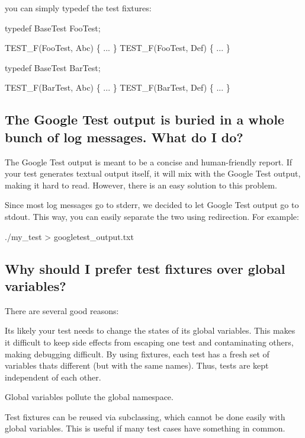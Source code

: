 you can simply {\ttfamily typedef} the test fixtures\+: 
\begin{DoxyCode}
typedef BaseTest FooTest;

TEST\_F(FooTest, Abc) \{ ... \}
TEST\_F(FooTest, Def) \{ ... \}

typedef BaseTest BarTest;

TEST\_F(BarTest, Abc) \{ ... \}
TEST\_F(BarTest, Def) \{ ... \}
\end{DoxyCode}


\subsection*{The Google Test output is buried in a whole bunch of log messages. What do I do?}

The Google Test output is meant to be a concise and human-\/friendly report. If your test generates textual output itself, it will mix with the Google Test output, making it hard to read. However, there is an easy solution to this problem.

Since most log messages go to stderr, we decided to let Google Test output go to stdout. This way, you can easily separate the two using redirection. For example\+: 
\begin{DoxyCode}
./my\_test > googletest\_output.txt
\end{DoxyCode}


\subsection*{Why should I prefer test fixtures over global variables?}

There are several good reasons\+:
\begin{DoxyEnumerate}
\item It\textquotesingle{}s likely your test needs to change the states of its global variables. This makes it difficult to keep side effects from escaping one test and contaminating others, making debugging difficult. By using fixtures, each test has a fresh set of variables that\textquotesingle{}s different (but with the same names). Thus, tests are kept independent of each other.
\end{DoxyEnumerate}
\begin{DoxyEnumerate}
\item Global variables pollute the global namespace.
\end{DoxyEnumerate}
\begin{DoxyEnumerate}
\item Test fixtures can be reused via subclassing, which cannot be done easily with global variables. This is useful if many test cases have something in common.
\end{DoxyEnumerate}

